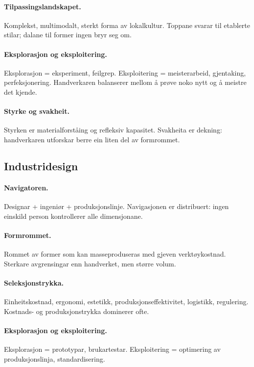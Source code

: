 \paragraph{Tilpassingslandskapet.}
Komplekst, multimodalt, sterkt forma av lokalkultur. Toppane
svarar til etablerte stilar; dalane til former ingen bryr seg om.

\paragraph{Eksplorasjon og eksploitering.}
Eksplorasjon = eksperiment, feilgrep. Eksploitering =
meisterarbeid, gjentaking, perfeksjonering. Handverkaren
balanserer mellom å prøve noko nytt og å meistre det kjende.

\paragraph{Styrke og svakheit.}
Styrken er materialforståing og refleksiv kapasitet. Svakheita er
dekning: handverkaren utforskar berre ein liten del av
formrommet.

\subsection{Industridesign}

\paragraph{Navigatoren.}
Designar + ingeniør + produksjonslinje. Navigasjonen er
distribuert: ingen einskild person kontrollerer alle
dimensjonane.

\paragraph{Formrommet.}
Rommet av former som kan masseproduseras med gjeven verktøykostnad.
Sterkare avgrensingar enn handverket, men større volum.

\paragraph{Seleksjonstrykka.}
Einheitskostnad, ergonomi, estetikk, produksjonseffektivitet,
logistikk, regulering. Kostnads- og produksjonstrykka dominerer
ofte.

\paragraph{Eksplorasjon og eksploitering.}
Eksplorasjon = prototypar, brukartestar. Eksploitering =
optimering av produksjonslinja, standardisering.

